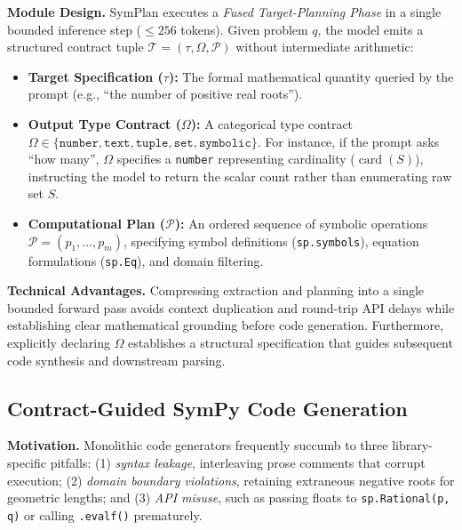 \documentclass[runningheads]{llncs}
\begin{document}
\textbf{Module Design.} SymPlan executes a \textit{Fused Target-Planning Phase} in a single bounded inference step ($\le 256$ tokens). Given problem $q$, the model emits a structured contract tuple $\mathcal{T} = (\tau, \Omega, \mathcal{P})$ without intermediate arithmetic:
\begin{itemize}
    \item \textbf{Target Specification ($\tau$):} The formal mathematical quantity queried by the prompt (e.g., ``the number of positive real roots'').
    \item \textbf{Output Type Contract ($\Omega$):} A categorical type contract $\Omega \in \{\texttt{number}, \texttt{text}, \texttt{tuple}, \texttt{set}, \texttt{symbolic}\}$. For instance, if the prompt asks ``how many'', $\Omega$ specifies a \texttt{number} representing cardinality ($\operatorname{card}(S)$), instructing the model to return the scalar count rather than enumerating raw set $S$.
    \item \textbf{Computational Plan ($\mathcal{P}$):} An ordered sequence of symbolic operations $\mathcal{P} = (p_1, \ldots, p_m)$, specifying symbol definitions (\texttt{sp.symbols}), equation formulations (\texttt{sp.Eq}), and domain filtering.
\end{itemize}

\textbf{Technical Advantages.} Compressing extraction and planning into a single bounded forward pass avoids context duplication and round-trip API delays while establishing clear mathematical grounding before code generation. Furthermore, explicitly declaring $\Omega$ establishes a structural specification that guides subsequent code synthesis and downstream parsing.

\subsection{Contract-Guided SymPy Code Generation}
\label{sec:codegen}

\textbf{Motivation.} Monolithic code generators frequently succumb to three library-specific pitfalls: (1) \textit{syntax leakage}, interleaving prose comments that corrupt execution; (2) \textit{domain boundary violations}, retaining extraneous negative roots for geometric lengths; and (3) \textit{API misuse}, such as passing floats to \texttt{sp.Rational(p, q)} or calling \texttt{.evalf()} prematurely.
\end{document}
